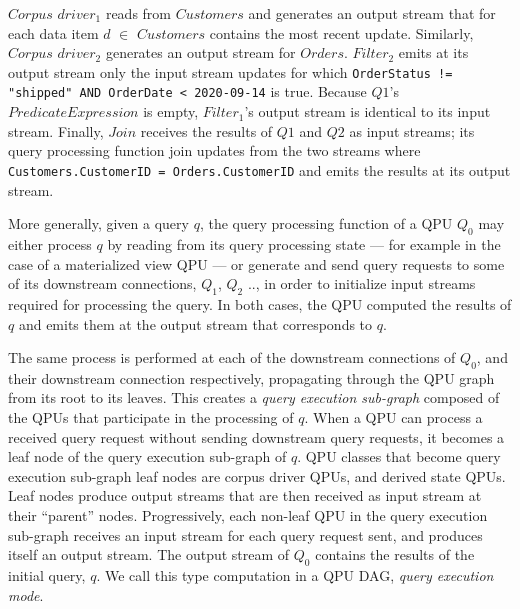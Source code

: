 $Corpus$ $driver_1$ reads from $Customers$ and generates an output stream that for each data item $d$ $\in$ $Customers$
contains the most recent update. Similarly, $Corpus$ $driver_2$ generates an output stream for $Orders$.
$Filter_2$ emits at its output stream only the input stream updates for which
{\obeylines\obeyspaces
\texttt{OrderStatus != "shipped" AND OrderDate < 2020-09-14}}
is true.
Because $Q1$'s $PredicateExpression$ is empty, $Filter_1$'s output stream is identical to its input stream.
Finally, $Join$ receives the results of $Q1$ and $Q2$ as input streams; its query processing function join updates from
the two streams where
{\obeylines\obeyspaces
\texttt{Customers.CustomerID = Orders.CustomerID}}
and emits the results at its output stream.

\medskip
\noindent
More generally, given a query $q$, the query processing function of a QPU $Q_0$ may either process $q$ by reading from its
query processing state --- for example in the case of a materialized view QPU --- or generate and send query requests to
some of its downstream connections, $Q_1$, $Q_2$ .., in order to initialize input streams required for processing the query.
In both cases, the QPU computed the results of $q$ and emits them at the output stream that corresponds to $q$.

The same process is performed at each of the downstream connections of $Q_0$, and their downstream connection respectively,
propagating through the QPU graph from its root to its leaves.
This creates a \textit{query execution sub-graph} composed of the QPUs that participate in the processing of $q$.
When a QPU can process a received query request without sending downstream query requests, it becomes a leaf node of
the query execution sub-graph of $q$.
QPU classes that become query execution sub-graph leaf nodes are corpus driver QPUs, and derived state QPUs.
Leaf nodes produce output streams that are then received as input stream at their ``parent'' nodes.
Progressively, each non-leaf QPU in the query execution sub-graph receives an input stream for each query request sent,
and produces itself an output stream.
The output stream of $Q_0$ contains the results of the initial query, $q$.
We call this type computation in a QPU DAG, \textit{query execution mode}.

